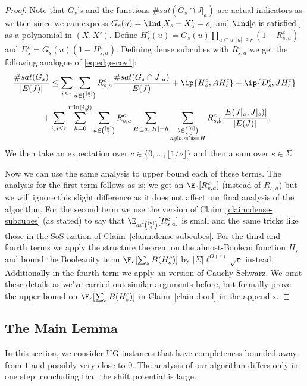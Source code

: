 \begin{proof}
Note that $G_s$'s and the functions $\#sat(G_s \cap J|_a)$ are actual indicators as written since we can express $G_s(u) = \Ind[X_s - X'_u = s]$ and $\Ind[e \text{ is satisfied }]$ as a polynomial in $(X,X')$. Define $H^c_s(u) = G_s(u)\prod_{a \subset u: |a| \leq r}(1-R^c_{s,a})$ and $D^c_{s} = G_s(u)(1 - H^c_{s,a})$. Defining dense subcubes with $R^c_{s,a}$ we get the following analogue of \eqref{eq:edge-cov1}:
\begin{align}\label{eq:edge-cov1-sos}
\frac{\#sat(G_s)}{|E(J)|} &\leq \sum_{i \leq r} \sum_{a \in {[n] \choose i}}R^c_{s,a} \frac{\# sat(G_s \cap J|_a)}{|E(J)|} +
\ip{H^c_s, AH^c_s} + \ip{D^c_s, JH^c_s} \notag\\+&\sum_{i, j \leq r} 
\sum\limits_{h=0}^{\min(i,j)}
\sum_{a \in {[n] \choose i}} R^c_{s,a}
\sum_{H\subseteq a, |H| = h}
\sum_{\substack{b \in {[n] \choose j} \\ a \neq b, a\cap b = H}} R^c_{s,b} \frac{|E(J|_a, J|_b)|}{|E(J)|}.
\end{align}
We then take an expectation over $c \in \{0,\ldots,\lfloor 1/\nu \rfloor\}$ and then a sum over $s \in \Sigma$.

Now we can use the same analysis to upper bound each of these terms. The analysis for the first term follows as is; we get an $\E_c[R^c_{s,a}]$ (instead of $R_{s,a}$) but we will ignore this slight difference as it does not affect our final analysis of the algorithm.
For the second term we use the \sos version of Claim~\ref{claim:dense-subcubes} (as stated) to say that $\E_{a \in {[n] \choose i}}[R^c_{s,a}]$ is small and the same tricks like those in the SoS-ization of Claim~\ref{claim:dense-subcubes}. For the third and fourth terms we apply the structure theorem on the almost-Boolean function $H_s$ and bound the Booleanity term $\E_c[\sum_s B(H^c_s)]$ by $|\Sigma|\ell^{O(r)}\sqrt{\nu}$ instead. Additionally in the fourth term we apply an \sos version of Cauchy-Schwarz. We omit these details as we've carried out similar arguments before, but formally prove the upper bound on $\E_c[\sum_s B(H^c_s)]$ in Claim~\ref{claim:bool} in the appendix.
\end{proof}


\subsection{The Main Lemma}
In this section, we consider UG instances that have completeness bounded away from $1$ and possibly very close to $0$. The analysis of our algorithm differs only in one step: concluding that the shift potential is large. 


